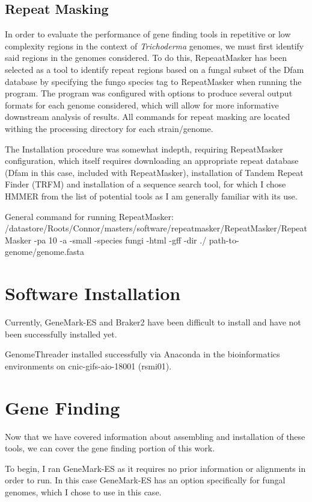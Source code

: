 \documentclass[12pt]{article}
\begin{document}
\subsection{Repeat Masking}

In order to evaluate the performance of gene finding tools in
repetitive or low complexity regions in the context of
\textit{Trichoderma} genomes, we must first identify said regions in
the genomes considered. To do this, RepeaatMasker has been selected as
a tool to identify repeat regions based on a fungal subset of the Dfam
database by specifying the fungo species tag to RepeatMasker when
running the program. The program was configured with options to
produce several output formats for each genome considered, which will
allow for more informative downstream analysis of results. All
commands for repeat masking are located withing the processing
directory for each strain/genome.

The Installation procedure was somewhat indepth, requiring
RepeatMasker configuration, which itself requires downloading an
appropriate repeat database (Dfam in this case, included with
RepeatMasker), installation of Tandem Repeat Finder (TRFM) and
installation of a sequence search tool, for which I chose HMMER from
the list of potential tools as I am generally familiar with its use.

General command for running RepeatMasker:
/datastore/Roots/Connor/masters/software/repeatmasker/RepeatMasker/RepeatMasker
-pa 10 -a -small -species fungi -html -gff -dir ./
path-to-genome/genome.fasta


\section{Software Installation}

Currently, GeneMark-ES and Braker2 have been difficult to install and
have not been successfully installed yet.

GenomeThreader installed successfully via Anaconda in the
bioinformatics environments on cnic-gifs-aio-18001 (rsmi01).

\section{Gene Finding}

Now that we have covered information about assembling and installation
of these tools, we can cover the gene finding portion of this work.

To begin, I ran GeneMark-ES as it requires no prior information or
alignments in order to run. In this case GeneMark-ES has an option
specifically for fungal genomes, which I chose to use in this case.
\end{document}
